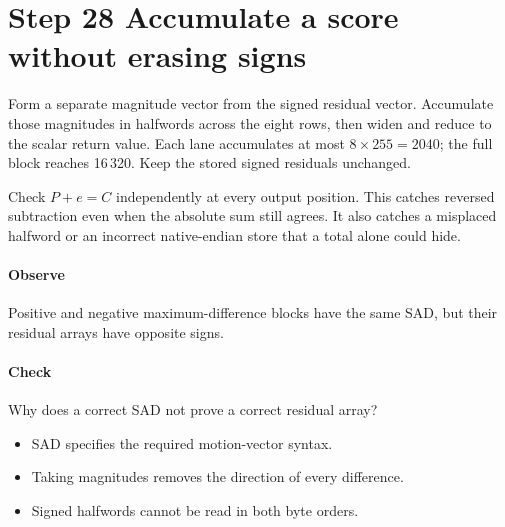 \section{Step 28 Accumulate a score without erasing signs}\label{h263-prediction-s08}
Form a separate magnitude vector from the signed residual vector. Accumulate
those magnitudes in halfwords across the eight rows, then widen and reduce to
the scalar return value. Each lane accumulates at most $8\times255=2040$;
the full block reaches 16\,320. Keep the stored signed residuals unchanged.

Check $P+e=C$ independently at every output position. This catches reversed
subtraction even when the absolute sum still agrees. It also catches a misplaced
halfword or an incorrect native-endian store that a total alone could hide.

\paragraph{Observe} Positive and negative maximum-difference blocks have the
same SAD, but their residual arrays have opposite signs.
\paragraph{Check} Why does a correct SAD not prove a correct residual array?
\begin{itemize}
  \item[A.] SAD specifies the required motion-vector syntax.
  \item[B.] Taking magnitudes removes the direction of every difference.
  \item[C.] Signed halfwords cannot be read in both byte orders.
\end{itemize}
